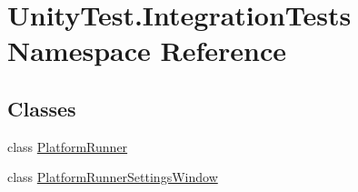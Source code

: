 \hypertarget{namespace_unity_test_1_1_integration_tests}{}\section{Unity\+Test.\+Integration\+Tests Namespace Reference}
\label{namespace_unity_test_1_1_integration_tests}
\subsection*{Classes}
\begin{DoxyCompactItemize}
\item 
class \hyperlink{class_unity_test_1_1_integration_tests_1_1_platform_runner}{Platform\+Runner}
\item 
class \hyperlink{class_unity_test_1_1_integration_tests_1_1_platform_runner_settings_window}{Platform\+Runner\+Settings\+Window}
\end{DoxyCompactItemize}
